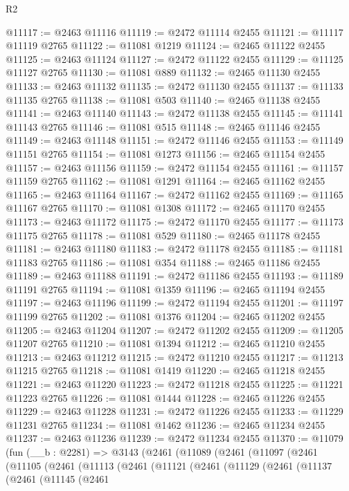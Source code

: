 \begin{lexlean}{R2}
\begin{coremodule}
@11117 := @2463 @11116
@11119 := @2472 @11114 @2455
@11121 := @11117 @11119 @2765
@11122 := @11081 @1219
@11124 := @2465 @11122 @2455
@11125 := @2463 @11124
@11127 := @2472 @11122 @2455
@11129 := @11125 @11127 @2765
@11130 := @11081 @889
@11132 := @2465 @11130 @2455
@11133 := @2463 @11132
@11135 := @2472 @11130 @2455
@11137 := @11133 @11135 @2765
@11138 := @11081 @503
@11140 := @2465 @11138 @2455
@11141 := @2463 @11140
@11143 := @2472 @11138 @2455
@11145 := @11141 @11143 @2765
@11146 := @11081 @515
@11148 := @2465 @11146 @2455
@11149 := @2463 @11148
@11151 := @2472 @11146 @2455
@11153 := @11149 @11151 @2765
@11154 := @11081 @1273
@11156 := @2465 @11154 @2455
@11157 := @2463 @11156
@11159 := @2472 @11154 @2455
@11161 := @11157 @11159 @2765
@11162 := @11081 @1291
@11164 := @2465 @11162 @2455
@11165 := @2463 @11164
@11167 := @2472 @11162 @2455
@11169 := @11165 @11167 @2765
@11170 := @11081 @1308
@11172 := @2465 @11170 @2455
@11173 := @2463 @11172
@11175 := @2472 @11170 @2455
@11177 := @11173 @11175 @2765
@11178 := @11081 @529
@11180 := @2465 @11178 @2455
@11181 := @2463 @11180
@11183 := @2472 @11178 @2455
@11185 := @11181 @11183 @2765
@11186 := @11081 @354
@11188 := @2465 @11186 @2455
@11189 := @2463 @11188
@11191 := @2472 @11186 @2455
@11193 := @11189 @11191 @2765
@11194 := @11081 @1359
@11196 := @2465 @11194 @2455
@11197 := @2463 @11196
@11199 := @2472 @11194 @2455
@11201 := @11197 @11199 @2765
@11202 := @11081 @1376
@11204 := @2465 @11202 @2455
@11205 := @2463 @11204
@11207 := @2472 @11202 @2455
@11209 := @11205 @11207 @2765
@11210 := @11081 @1394
@11212 := @2465 @11210 @2455
@11213 := @2463 @11212
@11215 := @2472 @11210 @2455
@11217 := @11213 @11215 @2765
@11218 := @11081 @1419
@11220 := @2465 @11218 @2455
@11221 := @2463 @11220
@11223 := @2472 @11218 @2455
@11225 := @11221 @11223 @2765
@11226 := @11081 @1444
@11228 := @2465 @11226 @2455
@11229 := @2463 @11228
@11231 := @2472 @11226 @2455
@11233 := @11229 @11231 @2765
@11234 := @11081 @1462
@11236 := @2465 @11234 @2455
@11237 := @2463 @11236
@11239 := @2472 @11234 @2455
@11370 := @11079
    (fun (__b : @2281) =>
    @3143
      (@2461
        (@11089
          (@2461
            (@11097
              (@2461
                (@11105
                  (@2461
                    (@11113
                      (@2461
                        (@11121
                          (@2461
                            (@11129
                              (@2461
                                (@11137
                                  (@2461
                                    (@11145
                                      (@2461

\end{coremodule}
\end{lexlean}
